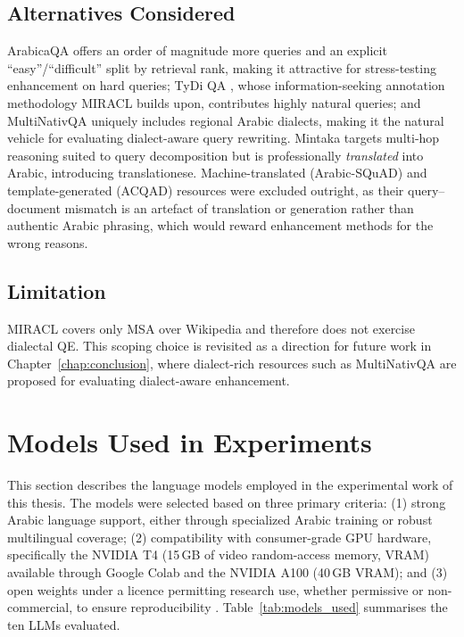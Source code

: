 \subsection{Alternatives Considered}
ArabicaQA \cite{abdallah_2024_arabicaqa} offers an order of magnitude more queries and an explicit ``easy''/``difficult'' split by retrieval rank, making it attractive for stress-testing enhancement on hard queries; TyDi QA \cite{clark_2020_tydiqa}, whose information-seeking annotation methodology MIRACL builds upon, contributes highly natural queries; and MultiNativQA \cite{hasan_2024_nativqa} uniquely includes regional Arabic dialects, making it the natural vehicle for evaluating dialect-aware query rewriting. Mintaka \cite{sen_2022_mintaka} targets multi-hop reasoning suited to query decomposition but is professionally \emph{translated} into Arabic, introducing translationese. Machine-translated (Arabic-SQuAD) and template-generated (ACQAD) resources were excluded outright, as their query--document mismatch is an artefact of translation or generation rather than authentic Arabic phrasing, which would reward enhancement methods for the wrong reasons.

\subsection{Limitation}
MIRACL covers only MSA over Wikipedia and therefore does not exercise dialectal QE. This scoping choice is revisited as a direction for future work in Chapter~\ref{chap:conclusion}, where dialect-rich resources such as MultiNativQA are proposed for evaluating dialect-aware enhancement.

\section{Models Used in Experiments}
\label{sec:models_used}

This section describes the language models employed in the experimental work of this thesis. The models were selected based on three primary criteria: (1) strong Arabic language support, either through specialized Arabic training or robust multilingual coverage; (2) compatibility with consumer-grade GPU hardware, specifically the NVIDIA T4 (15\,GB of video random-access memory, VRAM) available through Google Colab and the NVIDIA A100 (40\,GB VRAM); and (3) open weights under a licence permitting research use, whether permissive or non-commercial, to ensure reproducibility \cite{song_2024_a}. Table~\ref{tab:models_used} summarises the ten LLMs evaluated.

